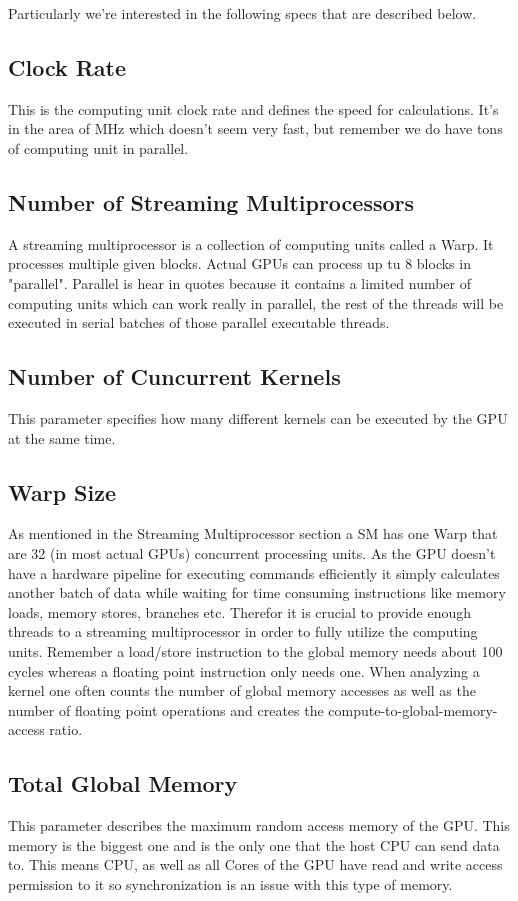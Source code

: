 Particularly we're interested in the following specs that are described below.\\

\subsection{Clock Rate}
This is the computing unit clock rate and defines the speed for calculations. It's in the area of MHz which doesn't seem very fast, but remember we do have tons of computing unit in parallel.

\subsection{Number of Streaming Multiprocessors}
A streaming multiprocessor is a collection of computing units called a Warp. It processes multiple given blocks. Actual GPUs can process up tu 8 blocks in "parallel". Parallel is hear in quotes because it contains a limited number of computing units which can work really in parallel, the rest of the threads will be executed in serial batches of those parallel executable threads.

\subsection{Number of Cuncurrent Kernels}
This parameter specifies how many different kernels can be executed by the GPU at the same time.

\subsection{Warp Size}
As mentioned in the Streaming Multiprocessor section a SM has one Warp that are 32 (in most actual GPUs) concurrent processing units. As the GPU doesn't have a hardware pipeline for executing commands efficiently it simply calculates another batch of data while waiting for time consuming instructions like memory loads, memory stores, branches etc. Therefor it is crucial to provide enough threads to a streaming multiprocessor in order to fully utilize the computing units. Remember a load/store instruction to the global memory needs about 100 cycles whereas a floating point instruction only needs one. When analyzing a kernel one often counts the number of global memory accesses as well as the number of floating point operations and creates the compute-to-global-memory-access ratio. 

\subsection{Total Global Memory}
This parameter describes the maximum random access memory of the GPU. This memory is the biggest one and is the only one that the host CPU can send data to. This means CPU, as well as all Cores of the GPU have read and write access permission to it so synchronization is an issue with this type of memory.

